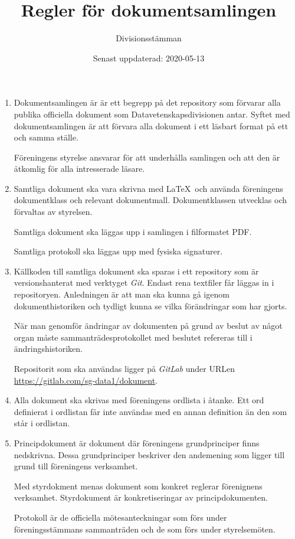 \documentclass{dvd}
\begin{document}
	\title{Regler för dokumentsamlingen}
	\author{Divisionsstämman}
	\date{Senast uppdaterad: 2020-05-13}

	\begin{enumerate}[label=\arabic* §, ref=\arabic*]
		\item Dokumentsamlingen är är ett begrepp på det repository som förvarar alla publika officiella dokument som Datavetenskapsdivisionen antar.
		Syftet med dokumentsamlingen är att förvara alla dokument i ett läsbart format på ett och samma ställe.

		Föreningens styrelse ansvarar för att underhålla samlingen och att den är åtkomlig för alla intresserade läsare.
		
		\item Samtliga dokument ska vara skrivna med \LaTeX~och använda föreningens dokumentklass och relevant dokumentmall.
		Dokumentklassen utvecklas och förvaltas av styrelsen.

		Samtliga dokument ska läggas upp i samlingen i filformatet PDF.

		Samtliga protokoll ska läggas upp med fysiska signaturer.
		
		\item Källkoden till samtliga dokument ska sparas i ett repository som är versionshanterat med verktyget \emph{Git}.
		Endast rena textfiler får läggas in i repositoryen.
		Anledningen är att man ska kunna gå igenom dokumenthistoriken och tydligt kunna se vilka förändringar som har gjorts.

		När man genomför ändringar av dokumenten på grund av beslut av något organ måste sammanträdesprotokollet med beslutet refereras till i ändringshistoriken.

		Repositorit som ska användas ligger på \emph{GitLab} under URLen \url{https://gitlab.com/sg-data1/dokument}.
		
		\item Alla dokument ska skrivas med föreningens ordlista i åtanke.
		Ett ord definierat i ordlistan får inte användas med en annan definition än den som står i ordlistan.

		\item Principdokument är dokument där föreningens grundprinciper finns nedskrivna.
		Dessa grundprinciper beskriver den andemening som ligger till grund till föreningens verksamhet.

		Med styrdokment menas dokument som konkret reglerar förenignens verksamhet.
		Styrdokument är konkretiseringar av principdokumenten.

		Protokoll är de officiella mötesanteckningar som förs under föreningsstämmans sammanträden och de som förs under styrelsemöten.
	\end{enumerate}
\end{document}
